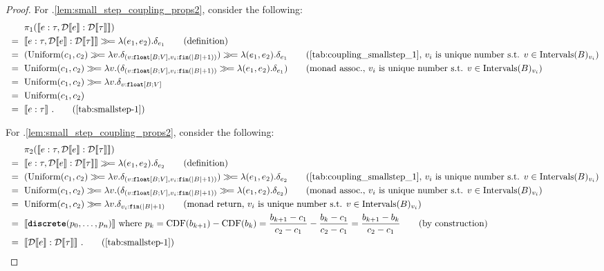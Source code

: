 \begin{proof}
	For .\ref{lem:small_step_coupling_props2}, consider the following:
	\begin{align*}
		 & \pi_1(\sem{e:\tau, \discretize{e} : \discretize{\tau}}) \\
		 ~{}={}~ &  \sem{e:\tau, \discretize{e} : \discretize{\tau}} \gg\!= \lambda(e_1,e_2). \delta_{e_1}  
		 \tag{definition} \\
		 ~{}={}~ & (\text{Uniform}(c_1, c_2) \gg\!= \lambda v.\delta_{(v : \floattype{B}{V}, v_i : \fin{|B| + 1})})\gg\!= \lambda(e_1,e_2). \delta_{e_1}  
		 \tag{\Cref{tab:coupling_smallstep_1}, $v_i$ is unique number s.t. $v \in \intervals{B}_{v_i}$} \\
		 ~{}={}~ & \text{Uniform}(c_1, c_2) \gg\!= \lambda v.(\delta_{(v : \floattype{B}{V}, v_i : \fin{|B| + 1})} \gg\!= \lambda(e_1,e_2). \delta_{e_1}  )
		 \tag{monad assoc., $v_i$ is unique number s.t. $v \in \intervals{B}_{v_i}$} \\
		 ~{}={}~ & \text{Uniform}(c_1, c_2) \gg\!= \lambda v. \delta_{v : \floattype{B}{V}}  
		 \\
		 ~{}={}~ & \text{Uniform}(c_1, c_2) \\
		 ~{}={}~ & \sem{e:\tau}~.
		 \tag{\Cref{tab:smallstep-1}}
	\end{align*}
	
	For .\ref{lem:small_step_coupling_props2}, consider the following:
	\begin{align*}
		& \pi_2(\sem{e:\tau, \discretize{e} : \discretize{\tau}}) \\
		~{}={}~ &  \sem{e:\tau, \discretize{e} : \discretize{\tau}} \gg\!= \lambda(e_1,e_2). \delta_{e_2}  
		\tag{definition} \\
		~{}={}~ & (\text{Uniform}(c_1, c_2) \gg\!= \lambda v.\delta_{(v : \floattype{B}{V}, v_i : \fin{|B| + 1})})\gg\!= \lambda(e_1,e_2). \delta_{e_2}  
		\tag{\Cref{tab:coupling_smallstep_1}, $v_i$ is unique number s.t. $v \in \intervals{B}_{v_i}$} \\
		~{}={}~ & \text{Uniform}(c_1, c_2) \gg\!= \lambda v.(\delta_{(v : \floattype{B}{V}, v_i : \fin{|B| + 1})} \gg\!= \lambda(e_1,e_2). \delta_{e_2}  )
		\tag{monad assoc., $v_i$ is unique number s.t. $v \in \intervals{B}_{v_i}$} \\
		~{}={}~ & \text{Uniform}(c_1, c_2) \gg\!= \lambda v. \delta_{v_i : \fin{|B| + 1}}  
		\tag{monad return, $v_i$ is unique number s.t. $v \in \intervals{B}_{v_i}$}
		\\
		~{}={}~ & \sem{\discrete(p_0,\ldots,p_n)}~\text{where}~p_k = \text{CDF}(b_{k+1}) - \text{CDF}(b_k) = \frac{b_{k+1} - c_1}{c_2-c_1} - \frac{b_{k} - c_1}{c_2-c_1}  =  \frac{b_{k+1} - b_k}{c_2-c_1} 
		\tag{by construction} \\
		~{}={}~ & \sem{\discretize{e}:\discretize{\tau}}~.
		\tag{\Cref{tab:smallstep-1}}
	\end{align*}
	

\end{proof}
